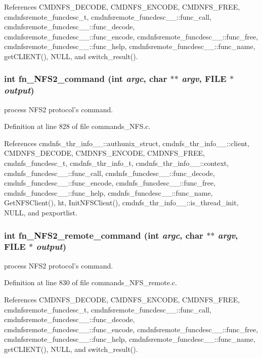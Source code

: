 References CMDNFS\_\-DECODE, CMDNFS\_\-ENCODE, CMDNFS\_\-FREE, cmdnfsremote\_\-funcdesc\_\-t, cmdnfsremote\_\-funcdesc\_\-\_\-::func\_\-call, cmdnfsremote\_\-funcdesc\_\-\_\-::func\_\-decode, cmdnfsremote\_\-funcdesc\_\-\_\-::func\_\-encode, cmdnfsremote\_\-funcdesc\_\-\_\-::func\_\-free, cmdnfsremote\_\-funcdesc\_\-\_\-::func\_\-help, cmdnfsremote\_\-funcdesc\_\-\_\-::func\_\-name, get\-CLIENT(), NULL, and switch\_\-result().
\subsubsection{\setlength{\rightskip}{0pt plus 5cm}int fn\_\-NFS2\_\-command (int {\em argc}, char $\ast$$\ast$ {\em argv}, FILE $\ast$ {\em output})}\label{commands_8h_a63}


process NFS2 protocol's command. 

Definition at line 828 of file commands\_\-NFS.c.

References cmdnfs\_\-thr\_\-info\_\-\_\-::authunix\_\-struct, cmdnfs\_\-thr\_\-info\_\-\_\-::client, CMDNFS\_\-DECODE, CMDNFS\_\-ENCODE, CMDNFS\_\-FREE, cmdnfs\_\-funcdesc\_\-t, cmdnfs\_\-thr\_\-info\_\-t, cmdnfs\_\-thr\_\-info\_\-\_\-::context, cmdnfs\_\-funcdesc\_\-\_\-::func\_\-call, cmdnfs\_\-funcdesc\_\-\_\-::func\_\-decode, cmdnfs\_\-funcdesc\_\-\_\-::func\_\-encode, cmdnfs\_\-funcdesc\_\-\_\-::func\_\-free, cmdnfs\_\-funcdesc\_\-\_\-::func\_\-help, cmdnfs\_\-funcdesc\_\-\_\-::func\_\-name, Get\-NFSClient(), ht, Init\-NFSClient(), cmdnfs\_\-thr\_\-info\_\-\_\-::is\_\-thread\_\-init, NULL, and pexportlist.
\subsubsection{\setlength{\rightskip}{0pt plus 5cm}int fn\_\-NFS2\_\-remote\_\-command (int {\em argc}, char $\ast$$\ast$ {\em argv}, FILE $\ast$ {\em output})}\label{commands_8h_a84}


process NFS2 protocol's command. 

Definition at line 830 of file commands\_\-NFS\_\-remote.c.

References CMDNFS\_\-DECODE, CMDNFS\_\-ENCODE, CMDNFS\_\-FREE, cmdnfsremote\_\-funcdesc\_\-t, cmdnfsremote\_\-funcdesc\_\-\_\-::func\_\-call, cmdnfsremote\_\-funcdesc\_\-\_\-::func\_\-decode, cmdnfsremote\_\-funcdesc\_\-\_\-::func\_\-encode, cmdnfsremote\_\-funcdesc\_\-\_\-::func\_\-free, cmdnfsremote\_\-funcdesc\_\-\_\-::func\_\-help, cmdnfsremote\_\-funcdesc\_\-\_\-::func\_\-name, get\-CLIENT(), NULL, and switch\_\-result().
